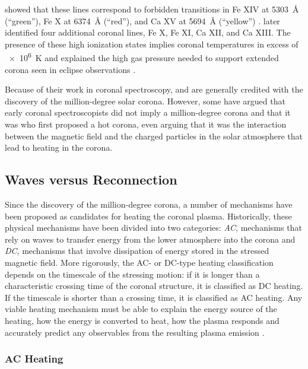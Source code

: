 \citet{grotrian_zur_1939} showed that these lines correspond to forbidden transitions in Fe XIV at \SI{5303}{\angstrom} (``green''), Fe X at \SI{6374}{\angstrom} (``red''), and Ca XV at \SI{5694}{\angstrom} (``yellow'') \citep[from Table 2.1 of][]{golub_solar_2010}. \citet{edlen_deutung_1943} later identified four additional coronal lines, Fe X, Fe XI, Ca XII, and Ca XIII. The presence of these high ionization states implies coronal temperatures in excess of \SI{e6}{\kelvin} and explained the high gas pressure needed to support extended corona seen in eclipse observations \citep{golub_solar_2010}.

Because of their work in coronal spectroscopy, \citet{grotrian_zur_1939} and \citet{edlen_deutung_1943} are generally credited with the discovery of the million-degree solar corona. However, some \citep[see][]{peter_discovery_2014} have argued that early coronal spectroscopists did not imply a million-degree corona and that it was \citet{alfven_solar_1941} who first proposed a hot corona, even arguing that it was the interaction between the magnetic field and the charged particles in the solar atmosphere that lead to heating in the corona.

\subsection{Waves versus Reconnection}\label{sec:waves-reconnection}

Since the discovery of the million-degree corona, a number of mechanisms have been proposed as candidates for heating the coronal plasma. Historically, these physical mechanisms have been divided into two categories: \textit{AC}, mechanisms that rely on waves to transfer energy from the lower atmosphere into the corona and \textit{DC}, mechanisms that involve dissipation of energy stored in the stressed magnetic field. More rigorously, the AC- or DC-type heating classification depends on the timescale of the stressing motion: if it is longer than a characteristic crossing time of the coronal structure, it is classified as DC heating. If the timescale is shorter than a crossing time, it is classified as AC heating. Any viable heating mechanism must be able to explain the energy source of the heating, how the energy is converted to heat, how the plasma responds and accurately predict any observables from the resulting plasma emission \citep[see Figure 1 of][]{klimchuk_solving_2006}.

\subsubsection{AC Heating}\label{sec:ac-heating}

